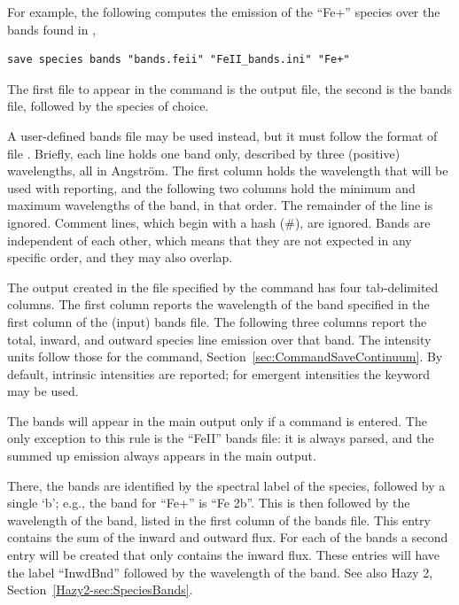 \par
For example, the following computes the emission of the ``Fe+'' species
over the bands found in ,
%
\begin{verbatim}
save species bands "bands.feii" "FeII_bands.ini" "Fe+"
\end{verbatim}
%
The first file to appear in the command is the output file,
the second is the bands file, followed by the species of choice.

\par
A user-defined bands file may be used instead, but it must follow the
format of file .
Briefly, each line holds one band only, described by three (positive)
wavelengths, all in Angstr\"{o}m.
The first column holds the wavelength that will be used with reporting,
and the following two columns hold the minimum and maximum wavelengths
of the band, in that order.
The remainder of the line is ignored.
Comment lines, which begin with a hash (\#), are ignored.
Bands are independent of each other, which means that they are not
expected in any specific order, and they may also overlap.

\par
The output created in the file specified by the  command
has four tab-delimited columns.
The first column reports the wavelength of the band specified in the
first column of the (input) bands file.
The following three columns report the total, inward, and outward
species line emission over that band.
The intensity units follow those for the  command,
Section~\ref{sec:CommandSaveContinuum}.
By default, intrinsic intensities are reported; for emergent intensities the
keyword  may be used.

\par
The bands will appear in the main output only if a  command is
entered.
The only exception to this rule is the ``FeII'' bands file: it is always parsed,
and the summed up emission always appears in the main output.

\par
There, the bands are identified by the spectral label of the species, followed
by a single `b'; e.g., the band for ``Fe+'' is ``Fe 2b''.
This is then followed by the wavelength of the band, listed in the
first column of the bands file.
This entry contains the sum of the inward and outward flux. For each of the
bands a second entry will be created that only contains the inward flux.
These entries will have the label ``InwdBnd'' followed by the wavelength of
the band.
See also Hazy 2, Section~\ref{Hazy2-sec:SpeciesBands}.

